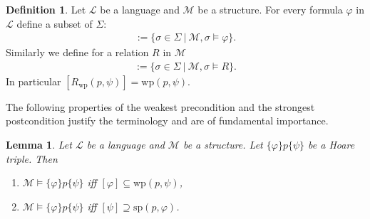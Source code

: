 \documentclass[acmsmall]{acmart}
\theoremstyle{plain}
\newtheorem{lemma}[theorem]{Lemma}
\theoremstyle{definition}
\newtheorem{definition}[theorem]{Definition}
\newcommand{\calL}{\mathcal{L}}
\newcommand{\calM}{\mathcal{M}}
\newcommand{\hoare}[3]{\{#1\}#2\{#3\}}
\renewcommand{\wp}{\mathrm{wp}}
\newcommand{\Rwp}{R_{\wp}}
\renewcommand{\sp}{\mathrm{sp}}
\begin{document}
\begin{definition}
	Let $\calL$ be a language and $\calM$ be a structure. For every formula $\varphi$ in $\calL$ define a subset of $\Sigma$:
	\begin{align*}
		[\varphi] := \{\sigma \in \Sigma ~|~ \calM,\sigma \models \varphi \}.
	\end{align*}
	Similarly we define for a relation $R$ in $\calM$
		\begin{align*}
		[R] := \{\sigma \in \Sigma ~|~ \calM,\sigma \models R \}.
	\end{align*}
	In particular $[\Rwp(p,\psi)] = \wp(p,\psi)$.
\end{definition}


The following properties of the weakest precondition and the strongest postcondition
justify the terminology and are of fundamental importance.

\begin{lemma}\label{lem.weakPreEquiv} 
	Let $\calL$ be a language and $\calM$ be a structure. Let $\hoare{\varphi}{p}{\psi}$ be a Hoare triple. Then
	\begin{enumerate}
		\item $\calM \models \hoare{\varphi}{p}{\psi}$ iff $[\varphi] \subseteq \wp(p,\psi)$,
		\item $\calM \models \hoare{\varphi}{p}{\psi}$ iff $ [\psi] \supseteq \sp(p,\varphi)$.
	\end{enumerate}
\end{lemma}
\end{document}
